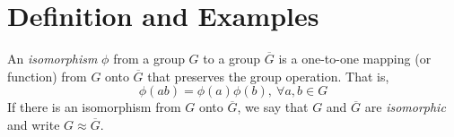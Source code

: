 \section{Definition and Examples}

\begin{definition}
	An \textit{isomorphism} $\phi$ from a group $G$ to a group $\overline{G}$ is a one-to-one mapping (or function) from $G$ onto $\overline{G}$ that preserves the group operation. That is,
	\[ \phi(ab) = \phi(a)\phi(b),\ \forall a,b \in G \]
	If there is an isomorphism from $G$ onto $\overline{G}$, we say that $G$ and $\overline{G}$ are \textit{isomorphic} and write $G \approx \overline{G}$.
\end{definition}
